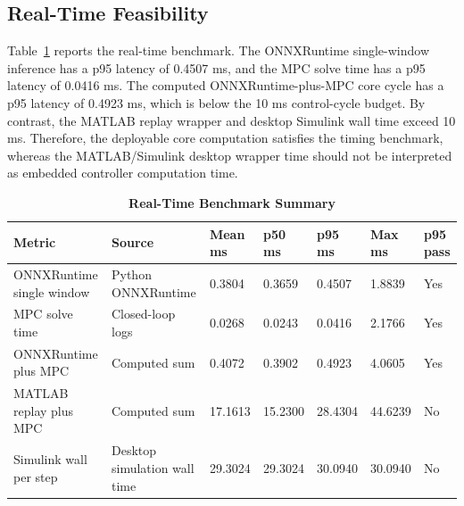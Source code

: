 \documentclass[twocolumn]{article}
\begin{document}
\subsection{Real-Time Feasibility}

Table~\ref{tab:realtime} reports the real-time benchmark. The ONNXRuntime single-window inference has a p95 latency of 0.4507 ms, and the MPC solve time has a p95 latency of 0.0416 ms. The computed ONNXRuntime-plus-MPC core cycle has a p95 latency of 0.4923 ms, which is below the 10 ms control-cycle budget. By contrast, the MATLAB replay wrapper and desktop Simulink wall time exceed 10 ms. Therefore, the deployable core computation satisfies the timing benchmark, whereas the MATLAB/Simulink desktop wrapper time should not be interpreted as embedded controller computation time.

\begin{table}[!t]

\caption{\textbf{Real-Time Benchmark Summary}}

\label{tab:realtime}

\setlength{\tabcolsep}{4pt}

\begin{tabular}{|p{125pt}|p{78pt}|p{45pt}|p{45pt}|p{45pt}|p{50pt}|p{45pt}|}

\hline

Metric & Source & Mean ms & p50 ms & p95 ms & Max ms & p95 pass \\

\hline

ONNXRuntime single window & Python ONNXRuntime & 0.3804 & 0.3659 & 0.4507 & 1.8839 & Yes \\

MPC solve time & Closed-loop logs & 0.0268 & 0.0243 & 0.0416 & 2.1766 & Yes \\

ONNXRuntime plus MPC & Computed sum & 0.4072 & 0.3902 & 0.4923 & 4.0605 & Yes \\

MATLAB replay plus MPC & Computed sum & 17.1613 & 15.2300 & 28.4304 & 44.6239 & No \\

Simulink wall per step & Desktop simulation wall time & 29.3024 & 29.3024 & 30.0940 & 30.0940 & No \\

\hline

\end{tabular}

\end{table}
\end{document}
